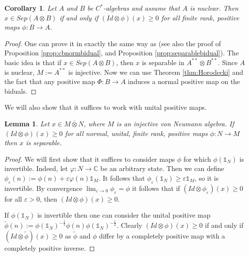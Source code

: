 \documentclass[11pt]{article}
\numberwithin{theorem}{section}
\newtheorem{lemma}[theorem]{Lemma}
\newtheorem{corollary}[theorem]{Corollary}
\begin{document}
\begin{corollary}\label{cor:horodeckicstar}
Let $A$ and $B$ be $C^{\ast}$-algebras and assume that $A$ is nuclear. Then $x\in Sep(A\otimes B)$ if and only if $(Id \otimes \phi)(x)\geqslant 0$ for all finite rank, positive maps $\phi: B \to A$.    
\end{corollary}
\begin{proof}
One can prove it in exactly the same way as \cite[Theorem 4.1]{MillerOlkiewicz} (see also the proof of Proposition \ref{prop:cbnormbidual}, and Proposition \ref{prop:separablebidual}). The basic idea is that if $x\in Sep(A\otimes B)$, then $x$ is separable in $A^{**}\otimes B^{**}$. Since $A$ is nuclear, $M:=A^{**}$ is injective. Now we can use Theorem \ref{thm:Horodecki} and the fact that any positive map $\Phi: B\rightarrow A$ induces a normal positive map on the biduals.
\end{proof}
We will also show that it suffices to work with unital positive maps.
\begin{lemma}
Let $x \in M\overline{\otimes} N$, where $M$ is an injective von Neumann algebra. If $(Id\otimes \phi)(x)\geqslant 0$ for all normal, unital, finite rank, positive maps $\phi: N\to M$ then $x$ is separable.
\end{lemma}
\begin{proof}
We will first show that it suffices to consider maps $\phi$ for which $\phi(\mathds{1}_{N})$ is invertible. Indeed, let $\varphi: N \to \mathbb{C}$ be an arbitrary state. Then we can define $\phi_{\varepsilon}(n):= \phi(n) +\varepsilon \varphi(n)\mathds{1}_{M}$. It follows that $\phi_{\varepsilon}(\mathds{1}_N) \geqslant \varepsilon \mathds{1}_{M}$, so it is invertible. By convergence $\lim_{\varepsilon \to 0} \phi_{\varepsilon} = \phi$ it follows that if $(Id\otimes \phi_{\varepsilon})(x)\geqslant 0$ for all $\varepsilon > 0$, then $(Id\otimes \phi)(x)\geqslant 0$.

If $\phi(\mathds{1}_{N})$ is invertible then one can consider the unital positive map $\widetilde{\phi}(n) := \phi(\mathds{1}_{N})^{-\frac{1}{2}}\phi(n) \phi(\mathds{1}_{N})^{-\frac{1}{2}}$. Clearly $(Id\otimes \phi)(x)\geqslant 0$ if and only if $(Id\otimes \widetilde{\phi})(x)\geqslant 0$ as $\widetilde{\phi}$ and $\phi$ differ by a completely positive map with a completely positive inverse.
\end{proof}
\end{document}
